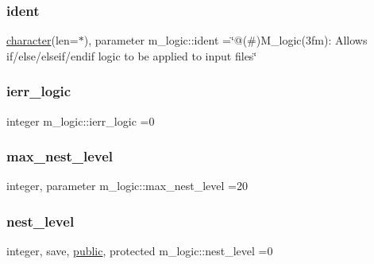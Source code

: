 \mbox{\label{namespacem__logic_aa4a758529f4ba04d66cddf4cd51e0bc1}} 
\subsubsection{\texorpdfstring{ident}{ident}}
{\footnotesize\ttfamily \hyperlink{option__stopwatch_83_8txt_abd4b21fbbd175834027b5224bfe97e66}{character}(len=$\ast$), parameter m\+\_\+logic\+::ident =\char`\"{}@(\#)M\+\_\+logic(3fm)\+: Allows if/else/elseif/endif logic to be applied to input files\char`\"{}\hspace{0.3cm}{\ttfamily [private]}}

\mbox{\label{namespacem__logic_a047a31b5831fda2a9421240f1edce712}} 
\subsubsection{\texorpdfstring{ierr\+\_\+logic}{ierr\_logic}}
{\footnotesize\ttfamily integer m\+\_\+logic\+::ierr\+\_\+logic =0\hspace{0.3cm}{\ttfamily [private]}}

\mbox{\label{namespacem__logic_a22ef0b94ebd8b7f3b35a33c8d9250759}} 
\subsubsection{\texorpdfstring{max\+\_\+nest\+\_\+level}{max\_nest\_level}}
{\footnotesize\ttfamily integer, parameter m\+\_\+logic\+::max\+\_\+nest\+\_\+level =20\hspace{0.3cm}{\ttfamily [private]}}

\mbox{\label{namespacem__logic_aba076b8206140be84ad573bc89c82b14}} 
\subsubsection{\texorpdfstring{nest\+\_\+level}{nest\_level}}
{\footnotesize\ttfamily integer, save, \hyperlink{M__stopwatch_83_8txt_a2f74811300c361e53b430611a7d1769f}{public}, protected m\+\_\+logic\+::nest\+\_\+level =0}

